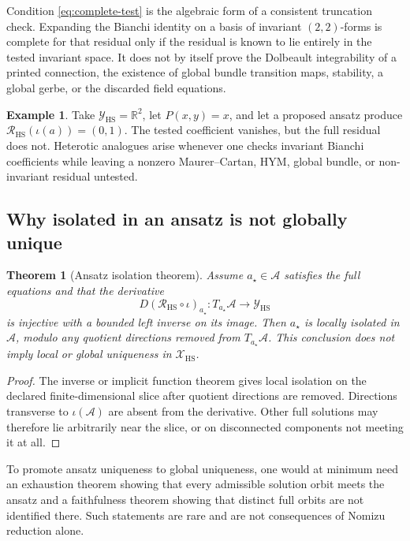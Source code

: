 \documentclass[11pt]{article}
\newcommand{\R}{\mathbb{R}}
\newcommand{\cA}{\mathcal{A}}
\newcommand{\cR}{\mathcal{R}}
\newcommand{\cX}{\mathcal{X}}
\newcommand{\cY}{\mathcal{Y}}
\newcommand{\HS}{\mathrm{HS}}
\numberwithin{equation}{section}
\theoremstyle{definition}
\newtheorem{example}[definition]{Example}
\theoremstyle{plain}
\newtheorem{theorem}[definition]{Theorem}
\theoremstyle{remark}
\begin{document}
Condition \cref{eq:complete-test} is the algebraic form of a consistent
truncation check.  Expanding the Bianchi identity on a basis of invariant
\((2,2)\)-forms is complete for that residual only if the residual is known
to lie entirely in the tested invariant space.  It does not by itself prove
the Dolbeault integrability of a printed connection, the existence of global
bundle transition maps, stability, a global gerbe, or the discarded field
equations.

\begin{example}
Take \(\cY_{\HS}=\R^2\), let \(P(x,y)=x\), and let a proposed ansatz produce
\(\cR_{\HS}(\iota(a))=(0,1)\).  The tested coefficient vanishes, but the full
residual does not.  Heterotic analogues arise whenever one checks invariant
Bianchi coefficients while leaving a nonzero Maurer--Cartan, HYM, global
bundle, or non-invariant residual untested.
\end{example}

\subsection{Why isolated in an ansatz is not globally unique}

\begin{theorem}[Ansatz isolation theorem]\label{thm:ansatz}
Assume \(a_\star\in\cA\) satisfies the full equations and that the derivative
\[
D(\cR_{\HS}\circ\iota)_{a_\star}:T_{a_\star}\cA
\longrightarrow\cY_{\HS}
\]
is injective with a bounded left inverse on its image.  Then \(a_\star\) is
locally isolated in \(\cA\), modulo any quotient directions removed from
\(T_{a_\star}\cA\).  This conclusion does not imply local or global
uniqueness in \(\cX_{\HS}\).
\end{theorem}

\begin{proof}
The inverse or implicit function theorem gives local isolation on the
declared finite-dimensional slice after quotient directions are removed.
Directions transverse to \(\iota(\cA)\) are absent from the derivative.
Other full solutions may therefore lie arbitrarily near the slice, or on
disconnected components not meeting it at all.
\end{proof}

To promote ansatz uniqueness to global uniqueness, one would at minimum need
an exhaustion theorem showing that every admissible solution orbit meets the
ansatz and a faithfulness theorem showing that distinct full orbits are not
identified there.  Such statements are rare and are not consequences of
Nomizu reduction alone.
\end{document}
